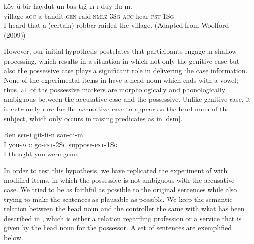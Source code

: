\documentclass[doc]{apa6}
\begin{document}
\begin{exe}
\ex \label{gensubj}
\gll k\"{o}y-\"{u} bir haydut-un bas-t{\i}\u{g}-{\i}n-{\i} duy-du-m.\\
village-\textsc{acc} a bandit-\textsc{gen} raid-\textsc{nmlz}-\textsc{3Sg}-\textsc{acc} hear-\textsc{pst}-\textsc{1Sg}\\
\glt I heard that a (certain) robber raided the village. (Adapted from Woolford (2009))
\end{exe}

However, our initial hypothesis postulates that participants engage in shallow processing, which results in a situation in which not only the genitive case but also the possessive case plays a significant role in delivering the case information. None of the experimental items in \textcite{Lago2018} have a head noun which ends with a vowel; thus, all of the possessive markers are morphologically and phonologically ambiguous between the accusative case and the possessive. Unlike genitive case, it is extremely rare for the accusative case to appear on the head noun of the subject, which only occurs in raising predicates as in \autoref{dsm}.

\begin{exe}
\ex \label{dsm}
\gll Ben sen-i git-ti-n san-d{\i}-m\\
I you-\textsc{acc} go-\textsc{pst}-\textsc{2Sg} suppose-\textsc{pst}-\textsc{1Sg}\\
\glt I thought you were gone.
\end{exe}

In order to test this hypothesis, we have replicated the experiment of \textcite{Lago2018} with modified items, in which the possessive is not ambiguous with the accusative case. We tried to be as faithful as possible to the original sentences while also trying to make the sentences as plausable as possible. We keep the semantic relation between the head noun and the controller the same with what has been described in \textcite{Lago2018}, which is either a relation regarding profession or a service that is given by the head noun for the possessor. A set of sentences are exemplified below.
\end{document}
